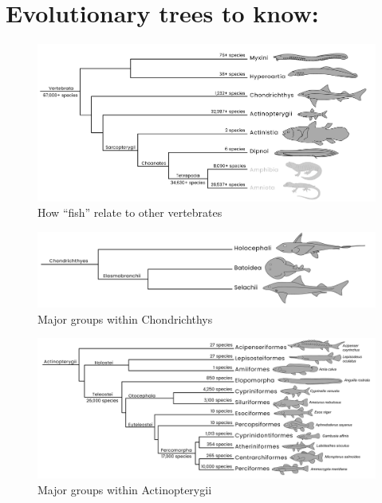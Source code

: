 \documentclass[a4paper,12pt]{article}
\begin{document}
%
%

\pagestyle{fancyplain}
\fancyhf{}
\thispagestyle{plain}

\section*{Evolutionary trees to know:}
\begin{figure}[h]
\centering
  \includegraphics[scale=0.3]{Vertebrata_fishes_tre.pdf}
  \caption{How ``fish'' relate to other vertebrates}
  \label{fig:Fishes}
\end{figure}

\begin{figure}[h]
\centering
  \includegraphics[scale=0.3]{Chondrichthys_tre.pdf}
  \caption{Major groups within Chondrichthys}
  \label{fig:Chondrichthys}
\end{figure}

\begin{figure}[h]
\centering
  \includegraphics[scale=0.3]{Actinopterygii_tre.pdf}
  \caption{Major groups within Actinopterygii}
  \label{fig:Actinopterygii}
\end{figure}
\end{document}

